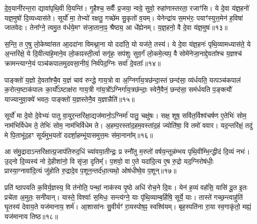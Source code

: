 दे॒व॒यानी॑रन्त॒रा द्यावा॑पृथि॒वी वि॒यन्ति॑। गृ॒हैश्च॒ सर्वैः᳚ प्र॒जया॒ न्वग्रे॒ सुवो॒ रुहा॑णास्तरता॒ रजाꣳ॑सि। ये दे॒वा य॑ज्ञ॒हनो॑ यज्ञ॒मुषो॑ दि॒व्यध्यास॑ते। सूर्यो॑ मा॒ तेभ्यो॑ रक्षतु॒ गच्छे॑म सु॒कृतो॑ व॒यम्। येनेन्द्रा॑य स॒मभ॑रः॒ पयाꣳ॑स्युत्त॒\-मेन॑ ह॒विषा॑ जातवेदः। तेना᳚ग्ने॒ त्वमु॒त व॑र्धये॒मꣳ स॑जा॒ताना॒ꣴ॒ श्रैष्ठ्य॒ आ धे᳚ह्येनम्। य॒ज्ञ॒हनो॒ वै दे॒वा य॑ज्ञ॒मुषः॑॥१३॥

स॒न्ति॒ त ए॒षु लो॒केष्वा॑सत आ॒ददा॑ना विमथ्ना॒ना यो ददा॑ति॒ यो यज॑ते॒ तस्य॑। ये दे॒वा य॑ज्ञ॒हनः॑ पृथि॒व्यामध्यास॑ते॒ ये अ॒न्तरि॑क्षे॒ ये दि॒वीत्या॑हे॒माने॒व लो॒काꣴस्ती॒र्त्वा सगृ॑हः॒ सप॑शुः सुव॒र्गं लो॒कमे॒त्यप॒ वै सोमे॑नेजा॒नाद्दे॒वता᳚श्च य॒ज्ञश्च॑ क्रामन्त्याग्ने॒यं पञ्च॑कपालमुदवसा॒नीयं॒ निर्व॑पेद॒ग्निः सर्वा॑ दे॒वताः᳚॥१४॥

पाङ्क्तो॑ य॒ज्ञो दे॒वता᳚श्चै॒व य॒ज्ञं चाव॑ रुन्द्धे गाय॒त्रो वा अ॒ग्निर्गा॑य॒त्रछ॑न्दा॒स्तं छन्द॑सा॒ व्य॑र्धयति॒ यत्पञ्च॑कपालं क॒रोत्य॒ष्टाक॑पालः का॒र्यो᳚\-ऽष्टाक्ष॑रा गाय॒त्री गा॑य॒त्रो᳚\-ऽग्निर्गा॑य॒त्रछ॑न्दाः॒ स्वेनै॒वैनं॒ छन्द॑सा॒ सम॑र्धयति प॒ङ्क्त्यौ॑ याज्यानुवा॒क्ये॑ भवतः॒ पाङ्क्तो॑ य॒ज्ञस्तेनै॒व य॒ज्ञान्नैति॑॥१५॥

{\anuvakamend[{स॒वि॒त॒र्दे॒वा य॑ज्ञ॒मुषः॒ सर्वा॑ दे॒वता॒स्त्रिच॑त्वारिꣳशच्च}]}%

सूर्यो॑ मा दे॒वो दे॒वेभ्यः॑ पातु वा॒युर॒न्तरि॑क्षा॒द्यज॑मानो॒\-ऽग्निर्मा॑ पातु॒ चक्षु॑षः। सक्ष॒ शूष॒ सवि॑त॒र्विश्व॑चर्\mbox{}षण ए॒तेभिः॑ सोम॒ नाम॑भिर्विधेम ते॒ तेभिः॑ सोम॒ नाम॑भिर्विधेम ते। अ॒हम्प॒रस्ता॑द॒हम॒वस्ता॑द॒हं ज्योति॑षा॒ वि तमो॑ ववार। यद॒न्तरि॑क्षं॒ तदु॑ मे पि॒ताभू॑द॒हꣳ सूर्य॑मुभ॒यतो॑ ददर्\mbox{}शा॒हम्भू॑यासमुत्त॒मः स॑मा॒नाना᳚म्॥१६॥

आ स॑मु॒द्रादा\-ऽन्तरि॑क्षात्प्र॒जाप॑तिरुद॒धिं च्या॑वया॒तीन्द्रः॒ प्र स्नौ॑तु म॒रुतो॑ वर्\mbox{}षय॒न्तून्न॑म्भय पृथि॒वीम्भि॒न्द्धीदं दि॒व्यं नभः॑। उ॒द्नो दि॒व्यस्य॑ नो दे॒हीशा॑नो॒ वि सृ॑जा॒ दृतिम्᳚। प॒शवो॒ वा ए॒ते यदा॑दि॒त्य ए॒ष रु॒द्रो यद॒ग्निरोष॑धीः॒ प्रास्या॒ग्नावा॑दि॒त्यं जु॑होति रु॒द्रादे॒व प॒शून॒न्तर्द॑धा॒त्यथो॒ ओष॑धीष्वे॒व प॒शून्॥१७॥

प्रति॑ ष्ठापयति क॒विर्य॒ज्ञस्य॒ वि त॑नोति॒ पन्थां॒ नाक॑स्य पृ॒ष्ठे अधि॑ रोच॒ने दि॒वः। येन॑ ह॒व्यं वह॑सि॒ यासि॑ दू॒त इ॒तः प्रचे॑ता अ॒मुतः॒ सनी॑यान्। यास्ते॒ विश्वाः᳚ स॒मिधः॒ सन्त्य॑ग्ने॒ याः पृ॑थि॒व्याम्ब॒र्\mbox{}हिषि॒ सूर्ये॒ याः। तास्ते॑ गच्छ॒न्त्वाहु॑तिं घृ॒तस्य॑ देवाय॒ते यज॑मानाय॒ शर्म॑। आ॒शासा॑नः सु॒वीर्यꣳ॑ रा॒यस्पोष॒ꣴ॒ स्वश्वि॑यम्। बृह॒स्पति॑ना रा॒या स्व॒गाकृ॑तो॒ मह्यं॒ यज॑मानाय तिष्ठ॥१८॥

{\anuvakamend[{स॒मा॒नाना॒मोष॑धीष्वे॒व प॒शून्मह्यं॒ यज॑माना॒यैक॑ञ्च}]}%

